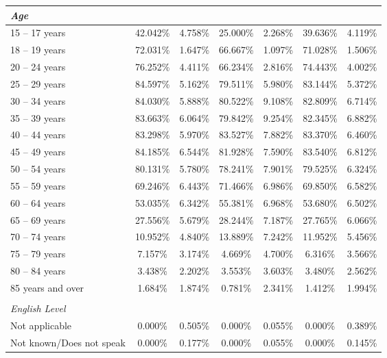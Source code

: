 \begin{longtable}{l*6c}
  \\
  \multicolumn{7}{l}{\textit{Age}} \\ \hline
  15 -- 17 years
  & 42.042\% & 4.758\%   & 25.000\% & 2.268\%  & 39.636\% & 4.119\%  \\
  18 -- 19 years
  & 72.031\% & 1.647\%   & 66.667\% & 1.097\%  & 71.028\% & 1.506\%  \\
  20 -- 24 years
  & 76.252\% & 4.411\%   & 66.234\% & 2.816\%  & 74.443\% & 4.002\%  \\
  25 -- 29 years
  & 84.597\% & 5.162\%   & 79.511\% & 5.980\%  & 83.144\% & 5.372\%  \\
  30 -- 34 years
  & 84.030\% & 5.888\%   & 80.522\% & 9.108\%  & 82.809\% & 6.714\%  \\
  35 -- 39 years
  & 83.663\% & 6.064\%   & 79.842\% & 9.254\%  & 82.345\% & 6.882\%  \\
  40 -- 44 years
  & 83.298\% & 5.970\%   & 83.527\% & 7.882\%  & 83.370\% & 6.460\%  \\
  45 -- 49 years
  & 84.185\% & 6.544\%   & 81.928\% & 7.590\%  & 83.540\% & 6.812\%  \\
  50 -- 54 years
  & 80.131\% & 5.780\%   & 78.241\% & 7.901\%  & 79.525\% & 6.324\%  \\
  55 -- 59 years
  & 69.246\% & 6.443\%   & 71.466\% & 6.986\%  & 69.850\% & 6.582\%  \\
  60 -- 64 years
  & 53.035\% & 6.342\%   & 55.381\% & 6.968\%  & 53.680\% & 6.502\%  \\
  65 -- 69 years
  & 27.556\% & 5.679\%   & 28.244\% & 7.187\%  & 27.765\% & 6.066\%  \\
  70 -- 74 years
  & 10.952\% & 4.840\%   & 13.889\% & 7.242\%  & 11.952\% & 5.456\%  \\
  75 -- 79 years
  & 7.157\%  & 3.174\%   & 4.669\%  & 4.700\%  & 6.316\%  & 3.566\%  \\
  80 -- 84 years
  & 3.438\%  & 2.202\%   & 3.553\%  & 3.603\%  & 3.480\%  & 2.562\%  \\
  85 years and over
  & 1.684\%  & 1.874\%   & 0.781\%  & 2.341\%  & 1.412\%  & 1.994\%  \\
  \\
  \multicolumn{7}{l}{\textit{English Level}} \\ \hline
  Not applicable
  & 0.000\%  & 0.505\%   & 0.000\%  & 0.055\%  & 0.000\%  & 0.389\%  \\
  Not known/Does not speak
  & 0.000\%  & 0.177\%   & 0.000\%  & 0.055\%  & 0.000\%  & 0.145\%  \\

\end{longtable}
